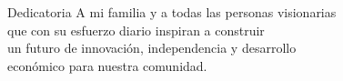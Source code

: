\begin{estilodedicatoria}{Dedicatoria}
    A mi familia y a todas las personas visionarias\\
    que con su esfuerzo diario inspiran a construir\\
    un futuro de innovación, independencia y desarrollo\\
    económico para nuestra comunidad.
\end{estilodedicatoria}
